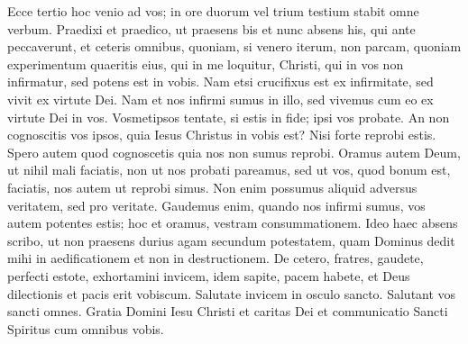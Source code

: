\begin{biblechapter}  
\verse Ecce tertio hoc venio ad vos; in ore duorum vel trium testium stabit omne verbum. 
\verse Praedixi et praedico, ut praesens bis et nunc absens his, qui ante peccaverunt, et ceteris omnibus, quoniam, si venero iterum, non parcam, 
\verse quoniam experimentum quaeritis eius, qui in me loquitur, Christi, qui in vos non infirmatur, sed potens est in vobis. 
\verse Nam etsi crucifixus est ex infirmitate, sed vivit ex virtute Dei. Nam et nos infirmi sumus in illo, sed vivemus cum eo ex virtute Dei in vos. 
\verse Vosmetipsos tentate, si estis in fide; ipsi vos probate. An non cognoscitis vos ipsos, quia Iesus Christus in vobis est? Nisi forte reprobi estis. 
\verse Spero autem quod cognoscetis quia nos non sumus reprobi. 
\verse Oramus autem Deum, ut nihil mali faciatis, non ut nos probati pareamus, sed ut vos, quod bonum est, faciatis, nos autem ut reprobi simus. 
\verse Non enim possumus aliquid adversus veritatem, sed pro veritate. 
\verse Gaudemus enim, quando nos infirmi sumus, vos autem potentes estis; hoc et oramus, vestram consummationem. 
\verse Ideo haec absens scribo, ut non praesens durius agam secundum potestatem, quam Dominus dedit mihi in aedificationem et non in destructionem. 
\verse De cetero, fratres, gaudete, perfecti estote, exhortamini invicem, idem sapite, pacem habete, et Deus dilectionis et pacis erit vobiscum. 
\verse Salutate invicem in osculo sancto. Salutant vos sancti omnes. 
\verse Gratia Domini Iesu Christi et caritas Dei et communicatio Sancti Spiritus cum omnibus vobis.   
\end{biblechapter}
